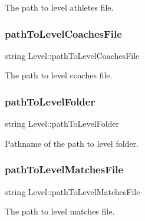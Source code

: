 The path to level athletes file. 

\hypertarget{class_level_a2c43373a0343a66b777d7e879544b5ae}{}\label{class_level_a2c43373a0343a66b777d7e879544b5ae} 
\subsubsection{\texorpdfstring{path\+To\+Level\+Coaches\+File}{pathToLevelCoachesFile}}
{\footnotesize\ttfamily string Level\+::path\+To\+Level\+Coaches\+File\hspace{0.3cm}{\ttfamily [private]}}



The path to level coaches file. 

\hypertarget{class_level_a2cb769dac86d869787a3a6cd90f32454}{}\label{class_level_a2cb769dac86d869787a3a6cd90f32454} 
\subsubsection{\texorpdfstring{path\+To\+Level\+Folder}{pathToLevelFolder}}
{\footnotesize\ttfamily string Level\+::path\+To\+Level\+Folder\hspace{0.3cm}{\ttfamily [private]}}



Pathname of the path to level folder. 

\hypertarget{class_level_a295d863ec897640e286b1f9848a36c46}{}\label{class_level_a295d863ec897640e286b1f9848a36c46} 
\subsubsection{\texorpdfstring{path\+To\+Level\+Matches\+File}{pathToLevelMatchesFile}}
{\footnotesize\ttfamily string Level\+::path\+To\+Level\+Matches\+File\hspace{0.3cm}{\ttfamily [private]}}



The path to level matches file. 

\hypertarget{class_level_aa13c0c2c38b5cb67f5aa51654710d9a7}{}\label{class_level_aa13c0c2c38b5cb67f5aa51654710d9a7} 
